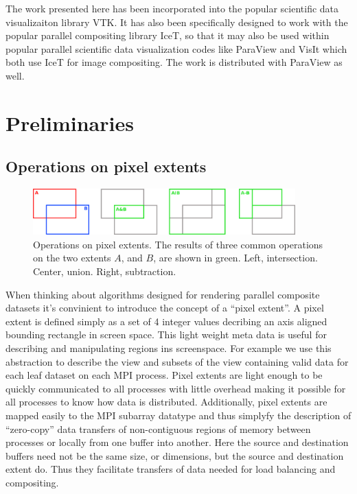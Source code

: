 \documentclass[a4paper,10pt]{article}
\begin{document}
The work presented here has been incorporated into the popular scientific data visualizaiton library VTK. It has also been specifically designed to work with the popular parallel compositing library IceT, so that it may also be used within popular parallel scientific data visualization codes like ParaView and VisIt which both use IceT for image compositing. The work is distributed with ParaView as well.
\FloatBarrier 

\section{Preliminaries}
\subsection{Operations on pixel extents}
\begin{figure}[h]
 \centering
 \includegraphics[width=0.9\textwidth]{./images-data/operations.png}
 \caption{Operations on pixel extents. The results of three common operations on the two extents $A$, and $B$, are shown in green. Left, intersection. Center, union. Right, subtraction.}
 \label{fig:pixel-ops}
\end{figure}

When thinking about algorithms designed for rendering parallel composite datasets it's convinient to introduce the concept of a ``pixel extent''. A pixel extent is defined simply as a set of 4 integer values decribing an axis aligned bounding rectangle in screen space. This light weight meta data is useful for describing and manipulating regions ins screenspace. For example we use this abstraction to describe the view and subsets of the view containing valid data for each leaf dataset on each MPI process. Pixel extents are light enough to be quickly communicated to all processes with little overhead making it possible for all processes to know how data is distributed. Additionally, pixel extents are mapped easily to the MPI subarray datatype and thus simplyfy the description of ``zero-copy'' data transfers of non-contiguous regions of memory between processes or locally from one buffer into another. Here the source and destination buffers need not be the same size, or dimensions, but the source and destination extent do. Thus they facilitate transfers of data needed for load balancing and compositing. 
\end{document}
